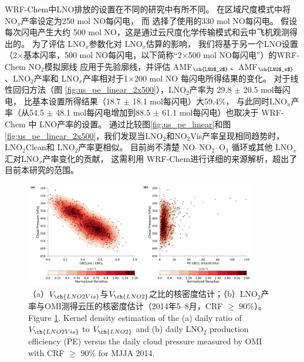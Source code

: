 WRF-Chem中LNO排放的设置在不同的研究中有所不同。
\citet{Zhao.2009}在区域尺度模式中将NO$_x$产率设定为250 mol NO每闪电，
而 \citet{Bela.2016}选择了\citet{Barth.2012}使用的330 mol NO每闪电。
\citet{Wang.2015a}假设每次闪电产生大约 500 mol NO，这是通过云尺度化学传输模式和云中飞机观测得出的\citep{Ott.2010}。
为了评估 LNO$_x$参数化对 LNO$_x$估算的影响，
我们将基于另一个LNO设置（2$\times$基本闪率，500 mol NO每闪电，以下简称“2$\times$500 mol NO每闪电”）的WRF-Chem NO$_2$模拟廓线
应用于先验廓线，并评估 AMF$_{\ch{LNO$_2$}}$、AMF$_{\ch{LNO$_x$}}$、LNO$_2$产率和 LNO$_x$产率相对于1$\times$200 mol NO 每闪电所得结果的变化。
对于线性回归方法（图 \ref{fig:us_pe_linear_2x500}），LNO$_2$产率为 29.8 $\pm$ 20.5 mol每闪电，
比基本设置所得结果（18.7 $\pm$ 18.1 mol每闪电）大59.4\%，
与此同时LNO$_x$产率（从54.5 $\pm$ 48.1 mol每闪电增加到88.5 $\pm$ 61.1 mol每闪电）也取决于 WRF-Chem 中 LNO产率的设置。
通过比较图\ref{fig:us_pe_linear}和图\ref{fig:us_pe_linear_2x500}，我们发现当LNO$_2$和NO$_2$Vis产率呈现相同趋势时，
LNO$_2$Clean和 LNO$_2$产率更相似。
目前尚不清楚 NO--NO$_2$--O$_3$ 循环或其他 LNO$_x$ 汇对LNO$_x$产率变化的贡献，
这需利用 WRF-Chem进行详细的来源解析，超出了目前本研究的范围。

\begin{figure}[H]
\centering
\includegraphics[width=0.9\textwidth]{./figures/us_cp_ratio_lno2.png}
\caption{（a）$V_{\ch{LNO2Vis}}$与$V_{\ch{LNO2}}$之比的核密度估计；（b）LNO$_2$产率与OMI测得云压的核密度估计（2014年5--8月，CRF $\geq$ 90\%）。\\
Figure \ref{fig:us_cp_ratio_lno2}. Kernel density estimation of the (a) daily ratio of $V_{\ch{LNO2Vis}}$ to $V_{\ch{LNO2}}$ and (b) daily LNO$_2$ production efficiency (PE) versus the daily cloud pressure measured by OMI with CRF $\geq$ 90\% for MJJA 2014.}
\label{fig:us_cp_ratio_lno2}
\end{figure}

